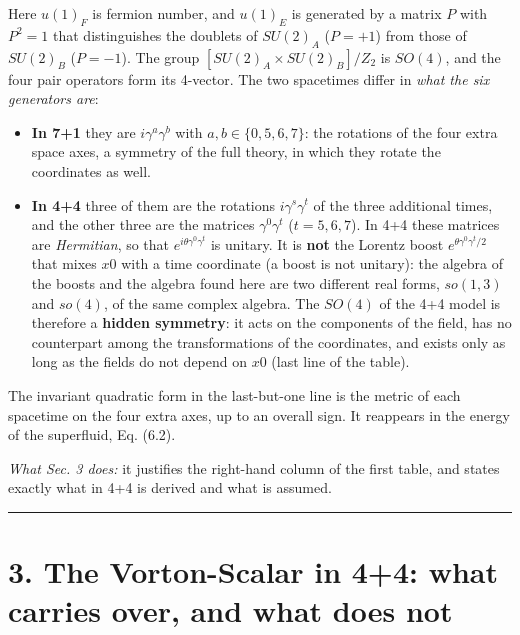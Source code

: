 \documentclass[
  10pt,
]{article}
\providecommand{\tightlist}{%
  \setlength{\itemsep}{0pt}\setlength{\parskip}{0pt}}
\begin{document}
Here \(u(1)_F\) is fermion number, and \(u(1)_E\) is generated by a
matrix \(P\) with \(P^2=1\) that distinguishes the doublets of
\(SU(2)_A\) (\(P=+1\)) from those of \(SU(2)_B\) (\(P=-1\)). The group
\([SU(2)_A\times SU(2)_B]/Z_2\) is \(SO(4)\), and the four pair
operators form its 4-vector. The two spacetimes differ in \emph{what the
six generators are}:

\begin{itemize}
\tightlist
\item
  \textbf{In 7+1} they are \(i\gamma^a\gamma^b\) with
  \(a,b\in\{0,5,6,7\}\): the rotations of the four extra space axes, a
  symmetry of the full theory, in which they rotate the coordinates as
  well.
\item
  \textbf{In 4+4} three of them are the rotations \(i\gamma^s\gamma^t\)
  of the three additional times, and the other three are the matrices
  \(\gamma^0\gamma^t\) (\(t=5,6,7\)). In 4+4 these matrices are
  \emph{Hermitian}, so that \(e^{i\theta\gamma^0\gamma^t}\) is unitary.
  It is \textbf{not} the Lorentz boost \(e^{\theta\gamma^0\gamma^t/2}\)
  that mixes \(x0\) with a time coordinate (a boost is not unitary): the
  algebra of the boosts and the algebra found here are two different
  real forms, \(so(1,3)\) and \(so(4)\), of the same complex algebra.
  The \(SO(4)\) of the 4+4 model is therefore a \textbf{hidden
  symmetry}: it acts on the components of the field, has no counterpart
  among the transformations of the coordinates, and exists only as long
  as the fields do not depend on \(x0\) (last line of the table).
\end{itemize}

The invariant quadratic form in the last-but-one line is the metric of
each spacetime on the four extra axes, up to an overall sign. It
reappears in the energy of the superfluid, Eq. (6.2).

\emph{What Sec. 3 does:} it justifies the right-hand column of the first
table, and states exactly what in 4+4 is derived and what is assumed.

\begin{center}\rule{0.5\linewidth}{0.5pt}\end{center}

\hypertarget{the-vorton-scalar-in-44-what-carries-over-and-what-does-not}{%
\section{3. The Vorton-Scalar in 4+4: what carries over, and what does
not}\label{the-vorton-scalar-in-44-what-carries-over-and-what-does-not}}
\end{document}

